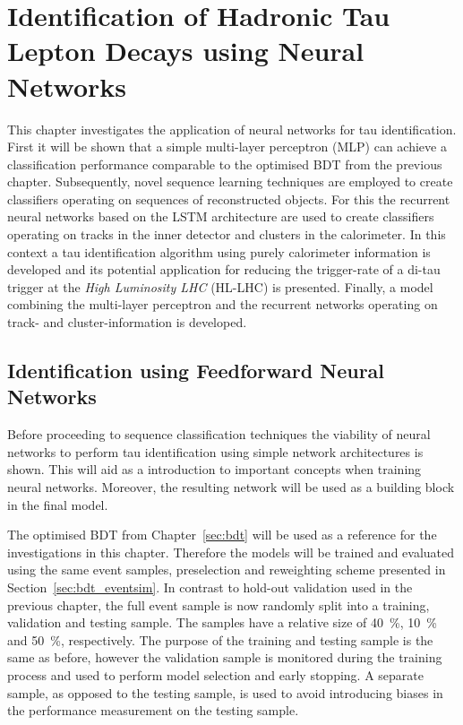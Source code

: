 \chapter{Identification of Hadronic Tau Lepton Decays using Neural Networks}
\label{sec:rnn}

This chapter investigates the application of neural networks for tau
identification. First it will be shown that a simple multi-layer perceptron
(MLP) can achieve a classification performance comparable to the optimised BDT
from the previous chapter. Subsequently, novel sequence learning techniques are
employed to create classifiers operating on sequences of reconstructed objects.
For this the recurrent neural networks based on the LSTM architecture are used
to create classifiers operating on tracks in the inner detector and clusters in
the calorimeter. In this context a tau identification algorithm using purely
calorimeter information is developed and its potential application for reducing
the trigger-rate of a di-tau trigger at the \emph{High Luminosity LHC} (HL-LHC)
is presented. Finally, a model combining the multi-layer perceptron and the
recurrent networks operating on track- and cluster-information is developed.


\section{Identification using Feedforward Neural Networks}
\label{sec:ffnn_id}

Before proceeding to sequence classification techniques the viability of neural
networks to perform tau identification using simple network architectures is
shown. This will aid as a introduction to important concepts when training
neural networks. Moreover, the resulting network will be used as a building
block in the final model.

The optimised BDT from Chapter~\ref{sec:bdt} will be used as a reference for the
investigations in this chapter. Therefore the models will be trained and
evaluated using the same event samples, preselection and reweighting scheme
presented in Section~\ref{sec:bdt_eventsim}. In contrast to hold-out validation
used in the previous chapter, the full event sample is now randomly split into a
training, validation and testing sample. The samples have a relative size of
\SI{40}{\percent}, \SI{10}{\percent} and \SI{50}{\percent}, respectively. The
purpose of the training and testing sample is the same as before, however the
validation sample is monitored during the training process and used to perform
model selection and early stopping. A separate sample, as opposed to the testing
sample, is used to avoid introducing biases in the performance measurement on
the testing sample.


